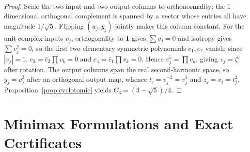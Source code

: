 \documentclass[11pt]{article}
\theoremstyle{plain}
\theoremstyle{definition}
\theoremstyle{remark}
\begin{document}
\begin{proof}
Scale the two input and two output columns to orthonormality; the $1$-dimensional orthogonal complement is spanned by a vector whose entries all have magnitude $1/\sqrt{5}$.
Flipping $(u_j, y_j)$ jointly makes this column constant.
For the unit complex inputs $v_j$, orthogonality to $\mathbf{1}$ gives $\sum v_j = 0$ and isotropy gives $\sum v_j^2 = 0$, so the first two elementary symmetric polynomials $e_1, e_2$ vanish; since $|v_j| = 1$, $e_3 = \bar{e}_2 \prod v_k = 0$ and $e_4 = \bar{e}_1 \prod v_k = 0$.
Hence $v_j^5 = \prod v_k$, giving $v_j = \zeta^j$ after rotation.
The output columns span the real second-harmonic space, so $y_j = v_j^2$ after an orthogonal output map, whence $t_j = v_j^{-2} = v_j^3$ and $z_j = v_j = t_j^2$. Proposition~\ref{prop:cyclotomic} yields $C_3 = (3 - \sqrt{5})/4$.
\end{proof}

\section{Minimax Formulations and Exact Certificates}
\end{document}

